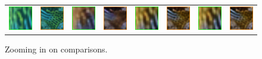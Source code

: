 \documentclass[letterpaper, 10pt, conference]{ieeeconf}
\begin{document}
\begin{figure}
\begin{tabular}{p{1.9cm} p{1.9cm} p{1.9cm} p{1.9cm} p{1.9cm} p{1.9cm} p{1.9cm} p{1.9cm} }
   \includegraphics[width=0.8in]{flickr_crop3} &
   \includegraphics[width=0.8in]{flickr_crop4} &
   \includegraphics[width=0.8in]{cgan_crop3} &
   \includegraphics[width=0.8in]{cgan_crop4} &
   \includegraphics[width=0.8in]{ugan_crop3} &
   \includegraphics[width=0.8in]{ugan_crop4} &
   \includegraphics[width=0.8in]{ugan_crop3} &
   \includegraphics[width=0.8in]{ugan_crop4} \\

\end{tabular}
\caption{Zooming in on comparisons.}
\end{figure}
\end{document}
